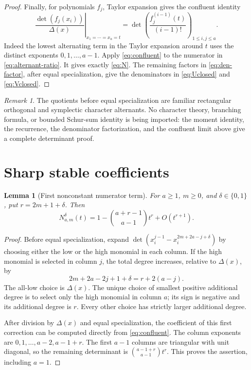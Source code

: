 \documentclass[11pt]{article}
\newtheorem{lemma}[theorem]{Lemma}
\theoremstyle{definition}
\theoremstyle{remark}
\newtheorem{remark}[theorem]{Remark}
\newcommand{\Dlt}{\Delta}
\theoremstyle{definition}
\theoremstyle{plain}
\numberwithin{equation}{section}
\begin{document}
\begin{proof}
Finally, for polynomials $f_j$, Taylor expansion gives the confluent identity
\begin{equation}
 \left.\frac{\det(f_j(x_i))}{\Dlt(x)}\right|_{x_1=\cdots=x_a=t}
 =\det\left(\frac{f_j^{(i-1)}(t)}{(i-1)!}\right)_{1\le i,j\le a}.
 \label{eq:confluent}
\end{equation}
Indeed the lowest alternating term in the Taylor expansion around $t$ uses
the distinct exponents $0,1,\ldots,a-1$.
Apply \eqref{eq:confluent} to the numerator in
\eqref{eq:alternant-ratio}. It gives exactly \eqref{eq:N}.
The remaining factors in \eqref{eq:den-factor}, after equal specialization,
give the denominators in \eqref{eq:Uclosed} and \eqref{eq:Vclosed}.
\end{proof}

\begin{remark}
The quotients before equal specialization are familiar rectangular
orthogonal and symplectic character alternants. No character theory,
branching formula, or bounded Schur-sum identity is being imported: the
moment identity, the recurrence, the denominator factorization, and the
confluent limit above give a complete determinant proof.
\end{remark}

\section{Sharp stable coefficients}
\label{sec:stable}

\begin{lemma}[First nonconstant numerator term]
\label{lem:first-term}
For $a\ge1$, $m\ge0$, and $\delta\in\{0,1\}$, put
$r=2m+1+\delta$. Then
\begin{equation}
 N^\delta_{a,m}(t)=1-\binom{a+r-1}{a-1}t^r+O(t^{r+1}).
 \label{eq:N-first}
\end{equation}
\end{lemma}
\begin{proof}
Before equal specialization, expand
$\det(x_i^{j-1}-x_i^{2m+2a-j+\delta})$ by choosing either the low or the
high monomial in each column. If the high monomial is selected in column
$j$, the total degree increases, relative to $\Dlt(x)$, by
\[
 2m+2a-2j+1+\delta=r+2(a-j).
\]
The all-low choice is $\Dlt(x)$. The unique choice of smallest positive
additional degree is to select only the high monomial in column $a$;
its sign is negative and its additional degree is $r$.
Every other choice has strictly larger additional degree.

After division by $\Dlt(x)$ and equal specialization, the coefficient of
this first correction can be computed directly from
\eqref{eq:confluent}. The column exponents are
$0,1,\ldots,a-2,a-1+r$. The first $a-1$ columns are triangular with
unit diagonal, so the remaining determinant is
$\binom{a-1+r}{a-1}t^r$. This proves the assertion, including $a=1$.
\end{proof}
\end{document}
